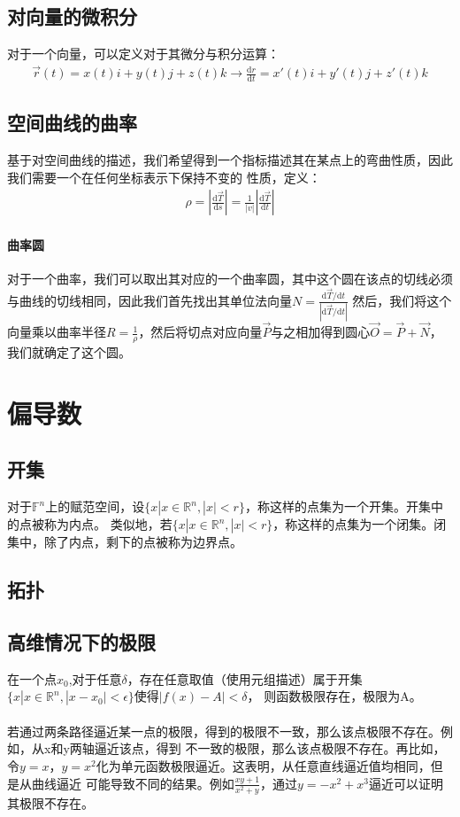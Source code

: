 \documentclass[12pt,a4paper,UTF8]{ctexbook}
\theoremstyle{plain}
\begin{document}
\subsection{对向量的微积分}
对于一个向量，可以定义对于其微分与积分运算：
\begin{align*}
    \vec r(t)=x(t)i+y(t)j+z(t)k \rightarrow \frac{\mathrm d r}{\mathrm d t}=x'(t) i+y'(t)j+z'(t)k
\end{align*}
\subsection{空间曲线的曲率}
基于对空间曲线的描述，我们希望得到一个指标描述其在某点上的弯曲性质，因此我们需要一个在任何坐标表示下保持不变的
性质，定义：
\begin{align*}
    \rho = |\frac{\mathrm{d}\vec T}{\mathrm{d}s}|=\frac{1}{|v|}|\frac{\mathrm d \vec T}{\mathrm d t}|
\end{align*}
\paragraph{曲率圆}
对于一个曲率，我们可以取出其对应的一个曲率圆，其中这个圆在该点的切线必须与曲线的切线相同，因此我们首先找出其单位法向量$N=\frac{\mathrm d \vec T/\mathrm dt}{|\mathrm d \vec T/\mathrm dt|}$
然后，我们将这个向量乘以曲率半径$R=\frac{1}{\rho}$，然后将切点对应向量$\vec P$与之相加得到圆心$\vec O=\vec P+\vec N$，我们就确定了这个圆。
\section{偏导数}
\subsection{开集}
对于$\mathbb{F}^n$上的赋范空间，设$\{x|x\in \mathbb{R}^n,|x|<r\}$，称这样的点集为一个开集。开集中的点被称为内点。
类似地，若$\{x|x\in \mathbb{R}^n,|x|<r\}$，称这样的点集为一个闭集。闭集中，除了内点，剩下的点被称为边界点。
\subsection{拓扑}
\subsection{高维情况下的极限}
在一个点$x_0$,对于任意$\delta$，存在任意取值（使用元组描述）属于开集$\{x|x\in \mathbb{R}^n,|x-x_0|<\epsilon\}$使得$|f(x)-A|<\delta$，
则函数极限存在，极限为A。
\paragraph{}若通过两条路径逼近某一点的极限，得到的极限不一致，那么该点极限不存在。例如，从x和y两轴逼近该点，得到
不一致的极限，那么该点极限不存在。再比如，令$y=x，y=x^2$化为单元函数极限逼近。这表明，从任意直线逼近值均相同，但是从曲线逼近
可能导致不同的结果。例如$\frac{xy+1}{x^2+y}$，通过$y=-x^2+x^3$逼近可以证明其极限不存在。
\end{document}
